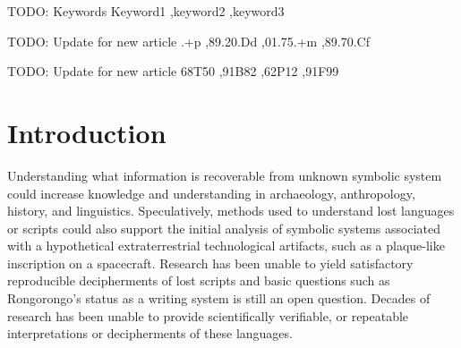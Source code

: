 \documentclass[preprint,12pt]{elsarticle}
\begin{document}
\begin{frontmatter}
\begin{keyword}
TODO: Keywords
Keyword1 \sep keyword2 \sep keyword3 

TODO: Update for new article
.+p \sep 89.20.Dd \sep 01.75.+m \sep 89.70.Cf

TODO: Update for new article
\MSC 68T50 \sep 91B82 \sep 62P12 \sep 91F99
\end{keyword}

\end{frontmatter}



\section{Introduction}

Understanding what information is recoverable from unknown symbolic system could increase knowledge and understanding in archaeology, anthropology, history, and linguistics. Speculatively, methods used to understand lost languages or scripts could also support the initial analysis of symbolic systems associated with a hypothetical extraterrestrial technological artifacts, such as a plaque-like inscription on a spacecraft. Research has been unable to yield satisfactory reproducible decipherments of lost scripts and basic questions such as Rongorongo's status as a writing system is still an open question\cite{tamburini2025_automatic_decipherment}. Decades of research has been unable to provide scientifically verifiable, or repeatable interpretations or decipherments of these languages. 
\end{document}
